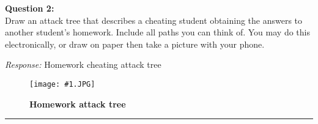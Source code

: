 \documentclass[a4paper, 11pt]{article}
\newcommand*{\img}[2]{
  \begin{figure}[!ht]
    \flushleft
    \texttt{[image: \#1.JPG]}
    \caption{\bf #2}
    \label{fig:#1}
      \end{figure}}
\newenvironment{problem}[2][Question]
               { \begin{mdframed}[backgroundcolor=gray!20] \textbf{#1 #2:} \\}
               {  \end{mdframed}}
\newenvironment{response}
                {\textit{Response:}}
                {}
\begin{document}
 \begin{problem}{2}
   Draw an attack tree that describes a cheating student obtaining the answers to another student’s homework.  Include all paths you can think of.  You may do this electronically, or draw on paper then take a picture with your phone.
 \end{problem}
 
 \begin{response}
   Homework cheating attack tree
   \img{Threat-tree}{Homework attack tree}
 \end{response}
 \noindent\rule{7in}{2.8pt}
\end{document}
